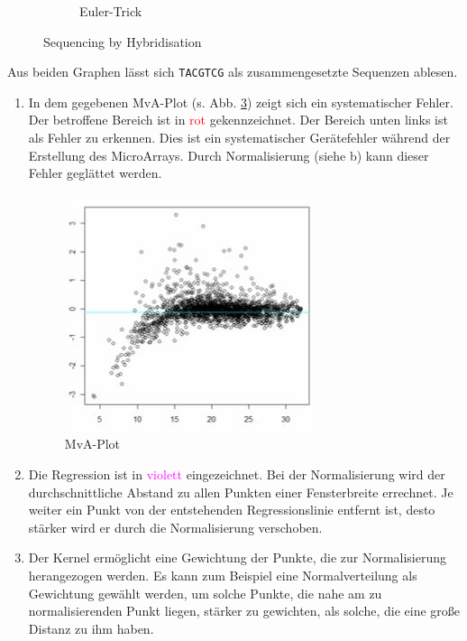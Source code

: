 \documentclass{homework}
\begin{document}
\begin{enumerate}
\begin{enumerate}
\begin{figure}
\begin{subfigure}{0.5\linewidth}
\caption{Euler-Trick}
\label{fig:42bb}
\end{subfigure}

\caption{Sequencing by Hybridisation}
\end{figure}

Aus beiden Graphen lässt sich \texttt{TACGTCG} als zusammengesetzte Sequenzen ablesen.
\end{enumerate}

\begin{enumerate}
<<<<<<< HEAD
\item In dem gegebenen MvA-Plot (s. Abb. \ref{fig:43}) zeigt sich ein systematischer Fehler.
Der betroffene Bereich ist in \textcolor{red}{rot} gekennzeichnet.
Der Bereich unten links ist als Fehler zu erkennen.
Dies ist ein systematischer Gerätefehler während der Erstellung des MicroArrays.
Durch Normalisierung (siehe b) kann dieser Fehler geglättet werden.

\begin{figure}
\centering
\includegraphics{data/albi_ueb11_a43_mva}
\caption{MvA-Plot}
\label{fig:43}
\end{figure}

\item Die Regression ist in \textcolor{magenta}{violett} eingezeichnet.
Bei der Normalisierung wird der durchschnittliche Abstand zu allen Punkten einer Fensterbreite errechnet.
Je weiter ein Punkt von der entstehenden Regressionslinie entfernt ist, desto stärker wird er durch die Normalisierung verschoben.

\item Der Kernel ermöglicht eine Gewichtung der Punkte, die zur Normalisierung herangezogen werden.
Es kann zum Beispiel eine Normalverteilung als Gewichtung gewählt werden, um solche Punkte, die nahe am zu normalisierenden Punkt liegen,
stärker zu gewichten, als solche, die eine große Distanz zu ihm haben.
\end{enumerate}


\end{enumerate}
\end{document}
